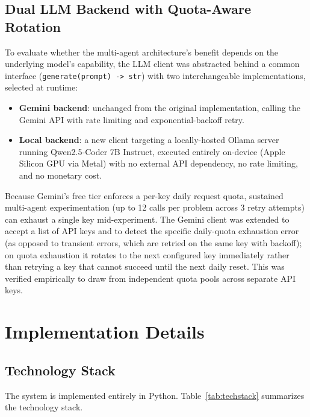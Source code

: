 \documentclass[conference]{IEEEtran}
\begin{document}
\subsection{Dual LLM Backend with Quota-Aware Rotation}
To evaluate whether the multi-agent architecture's benefit depends on the underlying model's capability, the LLM client was abstracted behind a common interface (\texttt{generate(prompt) -> str}) with two interchangeable implementations, selected at runtime:
\begin{itemize}
    \item \textbf{Gemini backend}: unchanged from the original implementation, calling the Gemini API with rate limiting and exponential-backoff retry.
    \item \textbf{Local backend}: a new client targeting a locally-hosted Ollama server running Qwen2.5-Coder 7B Instruct, executed entirely on-device (Apple Silicon GPU via Metal) with no external API dependency, no rate limiting, and no monetary cost.
\end{itemize}
Because Gemini's free tier enforces a per-key daily request quota, sustained multi-agent experimentation (up to 12 calls per problem across 3 retry attempts) can exhaust a single key mid-experiment. The Gemini client was extended to accept a list of API keys and to detect the specific daily-quota exhaustion error (as opposed to transient errors, which are retried on the same key with backoff); on quota exhaustion it rotates to the next configured key immediately rather than retrying a key that cannot succeed until the next daily reset. This was verified empirically to draw from independent quota pools across separate API keys.

\section{Implementation Details}

\subsection{Technology Stack}
The system is implemented entirely in Python. Table~\ref{tab:techstack} summarizes the technology stack.
\end{document}
